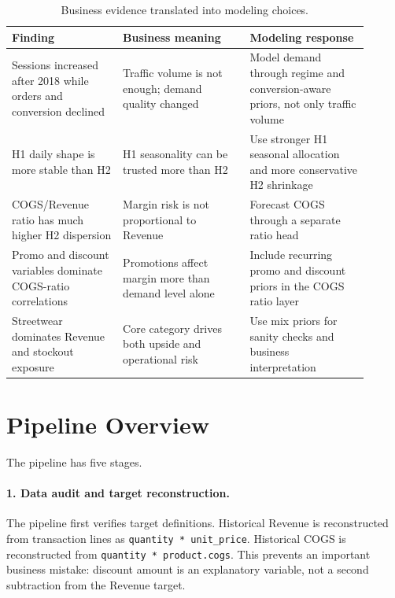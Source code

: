 \documentclass{article}
\begin{document}
\begin{table}[h]
\centering
\caption{Business evidence translated into modeling choices.}
\label{tab:evidence_to_model}
\begin{tabular}{p{0.28\linewidth}p{0.32\linewidth}p{0.30\linewidth}}
\toprule
Finding & Business meaning & Modeling response \\
\midrule
Sessions increased after 2018 while orders and conversion declined & Traffic volume is not enough; demand quality changed & Model demand through regime and conversion-aware priors, not only traffic volume \\
H1 daily shape is more stable than H2 & H1 seasonality can be trusted more than H2 & Use stronger H1 seasonal allocation and more conservative H2 shrinkage \\
COGS/Revenue ratio has much higher H2 dispersion & Margin risk is not proportional to Revenue & Forecast COGS through a separate ratio head \\
Promo and discount variables dominate COGS-ratio correlations & Promotions affect margin more than demand level alone & Include recurring promo and discount priors in the COGS ratio layer \\
Streetwear dominates Revenue and stockout exposure & Core category drives both upside and operational risk & Use mix priors for sanity checks and business interpretation \\
\bottomrule
\end{tabular}
\end{table}

\section{Pipeline Overview}

The pipeline has five stages.

\paragraph{1. Data audit and target reconstruction.}
The pipeline first verifies target definitions. Historical Revenue is reconstructed from transaction lines as \texttt{quantity * unit\_price}. Historical COGS is reconstructed from \texttt{quantity * product.cogs}. This prevents an important business mistake: discount amount is an explanatory variable, not a second subtraction from the Revenue target.
\end{document}
